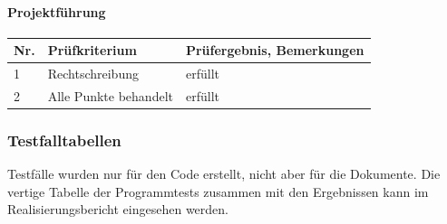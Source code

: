 \documentclass[10pt,paper=a4,final]{scrartcl}
\begin{document}
\paragraph{Projektf\"uhrung}
\begin{tabularx}{\textwidth}{|l|X|X|}
  \hline
  {{\bf Nr.}}\cellcolor{blue!20!} & {\bf Pr\"ufkriterium}\cellcolor{blue!20!} & {\bf Pr\"ufergebnis, Bemerkungen}\cellcolor{blue!20!} \\ \hline
  1 & Rechtschreibung & erf\"ullt \\ \hline
  2 & Alle Punkte behandelt & erf\"ullt\\ \hline
\end{tabularx}
\subsubsection{Testfalltabellen}
Testf\"alle wurden nur f\"ur den Code erstellt, nicht aber f\"ur die Dokumente. Die vertige Tabelle der Programmtests zusammen mit den Ergebnissen kann im Realisierungsbericht \cite{realisierung}eingesehen werden.
\end{document}

